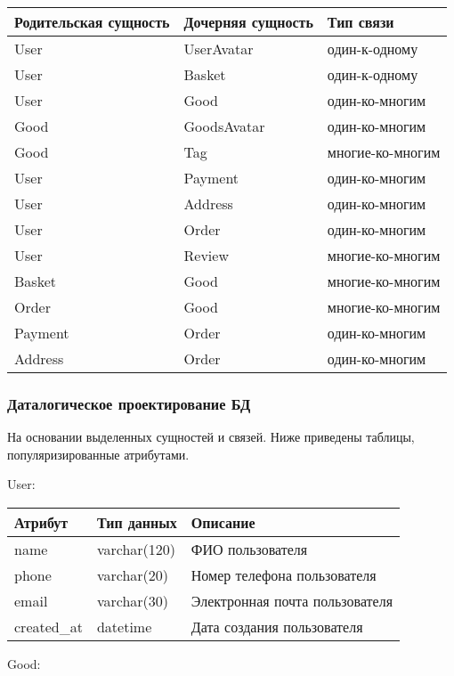 \begin{tabular}{ | l | l | l | }
\hline
Родительская сущность & Дочерняя сущность & Тип связи  \\ \hline
User & UserAvatar & один-к-одному \\ \hline
User & Basket & один-к-одному \\ \hline
User & Good & один-ко-многим \\ \hline
Good & GoodsAvatar & один-ко-многим \\ \hline
Good & Tag & многие-ко-многим \\ \hline
User & Payment & один-ко-многим \\ \hline
User & Address & один-ко-многим \\ \hline
User & Order & один-ко-многим \\ \hline
User & Review & многие-ко-многим \\ \hline
Basket & Good & многие-ко-многим \\ \hline
Order & Good & многие-ко-многим  \\ \hline
Payment & Order & один-ко-многим \\ \hline
Address & Order & один-ко-многим \\ \hline
\hline
\end{tabular}

\subsubsection{Даталогическое проектирование БД}
На основании выделенных сущностей и связей. Ниже приведены таблицы, популяризированные атрибутами.


User:

\begin{tabular}{ | l | l | l | }
    \hline
    Атрибут & Тип данных & Описание  \\ \hline
    name & varchar(120) & ФИО пользователя \\ \hline
    phone & varchar(20) & Номер телефона пользователя \\ \hline
    email & varchar(30) & Электронная почта пользователя \\ \hline
    created\_at & datetime & Дата создания пользователя \\
    \hline
\end{tabular}

Good:

